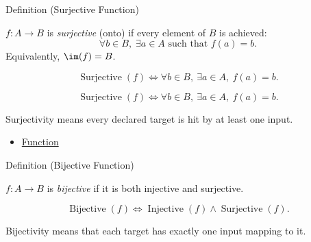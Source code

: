 \begin{definitionbox}{Definition (Surjective Function)}
\begin{definition}\label{def:surjective}
$f : A \to B$ is \emph{surjective} (onto) if every element of $B$ is achieved:
\[
\forall b \in B,\; \exists a \in A \text{ such that } f(a)=b.
\]
Equivalently, $\im(f) = B$.
\end{definition}
\end{definitionbox}

\begin{remark*}
\[
  \operatorname{Surjective}(f)
  \iff
  \forall b\in B,\ \exists a\in A,\ f(a)=b.
\]
\end{remark*}

\begin{remark*}
\[
  \operatorname{Surjective}(f)
  \iff
  \forall b\in B,\ \exists a\in A,\ f(a)=b.
\]
\end{remark*}

\begin{remark*}[Interpretation]
Surjectivity means every declared target is hit by at least one input.
\end{remark*}

\begin{dependencies}
\begin{itemize}
  \item \hyperref[def:function]{Function}
\end{itemize}
\end{dependencies}

\begin{definitionbox}{Definition (Bijective Function)}
\begin{definition}\label{def:bijective}
$f : A \to B$ is \emph{bijective} if it is both injective and surjective.
\end{definition}
\end{definitionbox}

\begin{remark*}
\[
  \operatorname{Bijective}(f)
  \iff
  \operatorname{Injective}(f)\wedge\operatorname{Surjective}(f).
\]
\end{remark*}

\begin{remark*}[Interpretation]
Bijectivity means that each target has exactly one input mapping to it.
\end{remark*}

